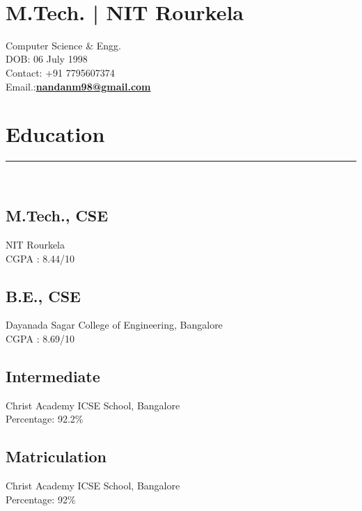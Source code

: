 \documentclass[]{rahulworld-resume}
\begin{document}
%
%

\begin{minipage}[t]{0.38\textwidth} 
\begin{large}
	\\
\end{large}
\section{M.Tech. | NIT Rourkela}
\vspace{0.2 cm}
Computer Science \&  Engg.\\
DOB: 06 July 1998\\
Contact: +91 7795607374\\
Email.:\textbf{\href{mailto:nandanm98@gmail.com}{nandanm98@gmail.com}}
\section{Education} 
\noindent\rule{7cm}{0.4pt}\\
\subsection{M.Tech., CSE}
NIT Rourkela \\
CGPA : 8.44/10\\
\vspace{4pt}
\subsection{B.E., CSE}
Dayanada Sagar College of Engineering, Bangalore \\
CGPA : 8.69/10\\
\vspace{4pt}
\subsection{Intermediate}
Christ Academy ICSE School, Bangalore\\
Percentage: 92.2\%\\
\vspace{4pt}
\subsection{Matriculation}
Christ Academy ICSE School, Bangalore\\
Percentage: 92\%\\

\end{minipage}
\end{document}
